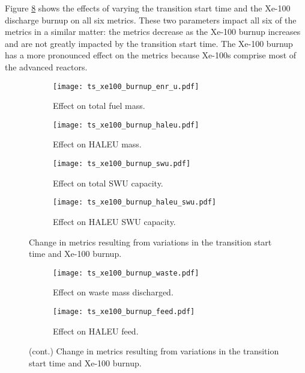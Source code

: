 Figure \ref{fig:ts_xe100_bu} shows the effects of varying the 
transition start time and the Xe-100 discharge burnup on all six 
metrics. These two parameters impact all six of the metrics in 
a similar matter: the metrics decrease as the Xe-100 burnup increases 
and are not greatly impacted by the transition start time. The 
Xe-100 burnup has a more pronounced effect on the metrics because Xe-100s 
comprise most of the advanced reactors. 

\begin{figure}
    \begin{subfigure}[h!]{0.48\textwidth}
        \centering
        \texttt{[image: ts\_xe100\_burnup\_enr\_u.pdf]}
        \caption{Effect on total fuel mass.}
        \label{fig:ts_xe100_bu_enr_u}
    \end{subfigure}
    \hfill
    \begin{subfigure}[h!]{0.48\textwidth}
        \centering
        \texttt{[image: ts\_xe100\_burnup\_haleu.pdf]}
        \caption{Effect on HALEU mass.}
        \label{fig:ts_xe100_bu_haleu}
    \end{subfigure}
    
    \begin{subfigure}[h!]{0.48\textwidth}
        \centering
        \texttt{[image: ts\_xe100\_burnup\_swu.pdf]}
        \caption{Effect on total SWU capacity.}
        \label{fig:ts_xe100_bu_swu}
    \end{subfigure}
    \hfill
    \begin{subfigure}[h!]{0.48\textwidth}
        \centering
        \texttt{[image: ts\_xe100\_burnup\_haleu\_swu.pdf]}
        \caption{Effect on HALEU SWU capacity.}
        \label{fig:ts_xe100_bu_haleu_swu}
    \end{subfigure}
    \caption{Change in metrics resulting from variations in the 
    transition start time and Xe-100 burnup.}
\end{figure}

\begin{figure}
    \ContinuedFloat    
    \begin{subfigure}[h!]{0.48\textwidth}
        \centering
        \texttt{[image: ts\_xe100\_burnup\_waste.pdf]}
        \caption{Effect on waste mass discharged.}
        \label{fig:ts_xe100_bu_waste}
    \end{subfigure}
    \hfill
    \begin{subfigure}[h!]{0.48\textwidth}
        \centering
        \texttt{[image: ts\_xe100\_burnup\_feed.pdf]}
        \caption{Effect on HALEU feed.}
        \label{fig:ts_xe100_bu_feed}
    \end{subfigure}
    \caption{(cont.) Change in metrics resulting from variations in the 
    transition start time and Xe-100 burnup.}
    \label{fig:ts_xe100_bu}
\end{figure}

